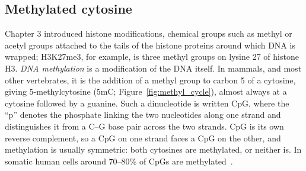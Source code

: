 \subsection{Methylated cytosine}

Chapter 3 introduced histone modifications, chemical groups such as methyl or acetyl groups attached to the tails of the histone proteins around which DNA is wrapped; H3K27me3, for example, is three methyl groups on lysine 27 of histone H3. \emph{DNA methylation} is a modification of the DNA itself. In mammals, and most other vertebrates, it is the addition of a methyl group to carbon 5 of a cytosine, giving 5-methylcytosine (5mC; Figure~\ref{fig:methyl_cycle}), almost always at a cytosine followed by a guanine. Such a dinucleotide is written CpG, where the ``p'' denotes the phosphate linking the two nucleotides along one strand and distinguishes it from a C--G base pair across the two strands. CpG is its own reverse complement, so a CpG on one strand faces a CpG on the other, and methylation is usually symmetric: both cytosines are methylated, or neither is. In somatic human cells around 70--80\% of CpGs are methylated~\citep{jones2012}.

